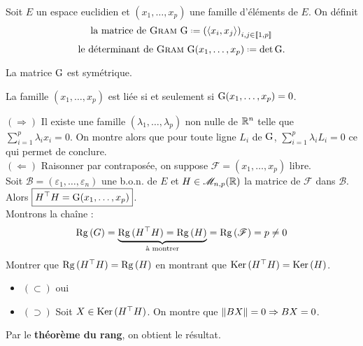 \begin{defi}
    Soit $E$ un espace euclidien et $(x_1, \dots, x_p)$ une famille d'éléments de $E$. On définit
    $$\text{la matrice de \textsc{Gram} } \Gram \defeq \left( \langle x_i, x_j \rangle \right)_{i,j \in \llbracket 1, p \rrbracket}$$
    $$\text{le déterminant de \textsc{Gram} } \Gram(x_1, \dots, x_p) \defeq \det \Gram.$$
\end{defi}


\begin{remarque}
    La matrice $\mathrm{G}$ est symétrique.
\end{remarque}

\begin{prop}
     La famille $(x_1, \dots, x_p)$ est liée si et seulement si $\mathrm{G}(x_1, \dots, x_p) = 0$.
\end{prop}

\begin{preuve}
    $(\Rightarrow)$ Il existe une famille $(\lambda_1, \dots, \lambda_p)$ non nulle  de $\mathbb{R}^n$ telle que $\sum\limits_{i=1}^{p} \lambda_i x_i = 0$. On montre alors que pour toute ligne $L_i$ de $\mathrm{G}$, $\sum\limits_{i=1}^{p} \lambda_i L_i = 0$ ce qui permet de conclure. \\
    $(\Leftarrow)$ Raisonner par contraposée, on suppose $\mathscr{F} = (x_1, \dots, x_p)$ libre. \\
    Soit $\mathscr{B} = (\varepsilon_1, \dots, \varepsilon_n)$ une b.o.n. de $E$ et $H \in \mathscr{M}_{n, p} (\mathbb{R})$ la matrice de $\mathscr{F}$ dans $\mathscr{B}$. \\
    Alors $\boxed{H^\top H = \mathrm{G}(x_1, \dots, x_p)}$. \\
    Montrons la chaîne :
    $$\mathrm{Rg}\,(G) = \underbrace{\mathrm{Rg}\,(H^\top H) = \mathrm{Rg}\,(H)}_{\text{à montrer}} = \mathrm{Rg}\,(\mathscr{F}) = p \not= 0$$
    Montrer que $\mathrm{Rg}\,(H^\top H) = \mathrm{Rg}\,(H)$ en montrant que $\mathrm{Ker}\,(H^\top H) = \mathrm{Ker}\,(H)$. 
    \begin{itemize}
        \item $(\subset)$ oui
        \item $(\supset)$ Soit $X \in \mathrm{Ker}\,(H^\top H)$. On montre que $\Vert BX \Vert = 0 \Rightarrow BX = 0$. 
    \end{itemize}
    Par le \textbf{théorème du rang}, on obtient le résultat. 
\end{preuve}

